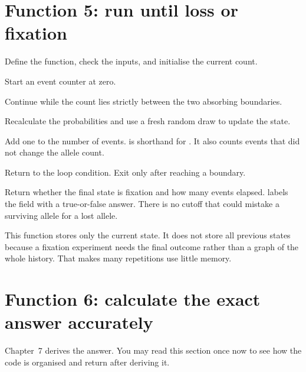 \section{Function 5: run until loss or fixation}


\begin{description}[style=nextline]
\item[Lines 71--73] Define the function, check the inputs, and initialise the current count.
\item[Line 74] Start an event counter at zero.
\item[Line 75] Continue while the count lies strictly between the two absorbing boundaries.
\item[Lines 76--77] Recalculate the probabilities and use a fresh random draw to update the state.
\item[Line 78] Add one to the number of events.  is shorthand for . It also counts events that did not change the allele count.
\item[Line 79] Return to the loop condition. Exit only after reaching a boundary.
\item[Lines 80--81] Return whether the final state is fixation and how many events elapsed.  labels the field  with a true-or-false answer. There is no cutoff that could mistake a surviving allele for a lost allele.
\end{description}

This function stores only the current state. It does not store all previous states because a fixation experiment needs the final outcome rather than a graph of the whole history. That makes many repetitions use little memory.

\section{Function 6: calculate the exact answer accurately}


Chapter~7 derives the answer. You may read this section once now to see how the code is organised and return after deriving it.

